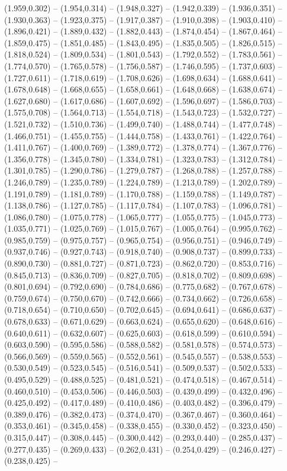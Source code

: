 (1.959,0.302) -- (1.954,0.314) -- (1.948,0.327) -- (1.942,0.339) -- (1.936,0.351) -- (1.930,0.363) -- (1.923,0.375) -- (1.917,0.387) -- (1.910,0.398) -- (1.903,0.410) -- (1.896,0.421) -- (1.889,0.432) -- (1.882,0.443) -- (1.874,0.454) -- (1.867,0.464) -- (1.859,0.475) -- (1.851,0.485) -- (1.843,0.495) -- (1.835,0.505) -- (1.826,0.515) -- (1.818,0.524) -- (1.809,0.534) -- (1.801,0.543) -- (1.792,0.552) -- (1.783,0.561) -- (1.774,0.570) -- (1.765,0.578) -- (1.756,0.587) -- (1.746,0.595) -- (1.737,0.603) -- (1.727,0.611) -- (1.718,0.619) -- (1.708,0.626) -- (1.698,0.634) -- (1.688,0.641) -- (1.678,0.648) -- (1.668,0.655) -- (1.658,0.661) -- (1.648,0.668) -- (1.638,0.674) -- (1.627,0.680) -- (1.617,0.686) -- (1.607,0.692) -- (1.596,0.697) -- (1.586,0.703) -- (1.575,0.708) -- (1.564,0.713) -- (1.554,0.718) -- (1.543,0.723) -- (1.532,0.727) -- (1.521,0.732) -- (1.510,0.736) -- (1.499,0.740) -- (1.488,0.744) -- (1.477,0.748) -- (1.466,0.751) -- (1.455,0.755) -- (1.444,0.758) -- (1.433,0.761) -- (1.422,0.764) -- (1.411,0.767) -- (1.400,0.769) -- (1.389,0.772) -- (1.378,0.774) -- (1.367,0.776) -- (1.356,0.778) -- (1.345,0.780) -- (1.334,0.781) -- (1.323,0.783) -- (1.312,0.784) -- (1.301,0.785) -- (1.290,0.786) -- (1.279,0.787) -- (1.268,0.788) -- (1.257,0.788) -- (1.246,0.789) -- (1.235,0.789) -- (1.224,0.789) -- (1.213,0.789) -- (1.202,0.789) -- (1.191,0.789) -- (1.181,0.789) -- (1.170,0.788) -- (1.159,0.788) -- (1.149,0.787) -- (1.138,0.786) -- (1.127,0.785) -- (1.117,0.784) -- (1.107,0.783) -- (1.096,0.781) -- (1.086,0.780) -- (1.075,0.778) -- (1.065,0.777) -- (1.055,0.775) -- (1.045,0.773) -- (1.035,0.771) -- (1.025,0.769) -- (1.015,0.767) -- (1.005,0.764) -- (0.995,0.762) -- (0.985,0.759) -- (0.975,0.757) -- (0.965,0.754) -- (0.956,0.751) -- (0.946,0.749) -- (0.937,0.746) -- (0.927,0.743) -- (0.918,0.740) -- (0.908,0.737) -- (0.899,0.733) -- (0.890,0.730) -- (0.881,0.727) -- (0.871,0.723) -- (0.862,0.720) -- (0.853,0.716) -- (0.845,0.713) -- (0.836,0.709) -- (0.827,0.705) -- (0.818,0.702) -- (0.809,0.698) -- (0.801,0.694) -- (0.792,0.690) -- (0.784,0.686) -- (0.775,0.682) -- (0.767,0.678) -- (0.759,0.674) -- (0.750,0.670) -- (0.742,0.666) -- (0.734,0.662) -- (0.726,0.658) -- (0.718,0.654) -- (0.710,0.650) -- (0.702,0.645) -- (0.694,0.641) -- (0.686,0.637) -- (0.678,0.633) -- (0.671,0.629) -- (0.663,0.624) -- (0.655,0.620) -- (0.648,0.616) -- (0.640,0.611) -- (0.632,0.607) -- (0.625,0.603) -- (0.618,0.599) -- (0.610,0.594) -- (0.603,0.590) -- (0.595,0.586) -- (0.588,0.582) -- (0.581,0.578) -- (0.574,0.573) -- (0.566,0.569) -- (0.559,0.565) -- (0.552,0.561) -- (0.545,0.557) -- (0.538,0.553) -- (0.530,0.549) -- (0.523,0.545) -- (0.516,0.541) -- (0.509,0.537) -- (0.502,0.533) -- (0.495,0.529) -- (0.488,0.525) -- (0.481,0.521) -- (0.474,0.518) -- (0.467,0.514) -- (0.460,0.510) -- (0.453,0.506) -- (0.446,0.503) -- (0.439,0.499) -- (0.432,0.496) -- (0.425,0.492) -- (0.417,0.489) -- (0.410,0.486) -- (0.403,0.482) -- (0.396,0.479) -- (0.389,0.476) -- (0.382,0.473) -- (0.374,0.470) -- (0.367,0.467) -- (0.360,0.464) -- (0.353,0.461) -- (0.345,0.458) -- (0.338,0.455) -- (0.330,0.452) -- (0.323,0.450) -- (0.315,0.447) -- (0.308,0.445) -- (0.300,0.442) -- (0.293,0.440) -- (0.285,0.437) -- (0.277,0.435) -- (0.269,0.433) -- (0.262,0.431) -- (0.254,0.429) -- (0.246,0.427) -- (0.238,0.425) -- 